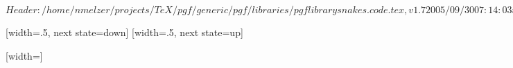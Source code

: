 \ProvidesPackageRCS[v\pgfversion] $Header: /home/nmelzer/projects/TeX/pgf/generic/pgf/libraries/pgflibrarysnakes.code.tex,v 1.7 2005/09/30 07:14:03 tantau Exp $

%


\newdimen\pgfsnakesegmentamplitude
\newdimen\pgfsnakesegmentlength
\def\pgfsnakesegmentangle{45}
\def\pgfsnakesegmentobjectlength{\pgfsnakesegmentamplitude}
\def\pgfsnakesegmentaspect{0.5}

\pgfsnakesegmentlength=10pt
\pgfsnakesegmentamplitude=2.5pt








%

{
  [width=.5\pgfsnakesegmentlength,%
             next state=down]
  {
    \pgfpathlineto{\pgfpoint{.25\pgfsnakesegmentlength}{\pgfsnakesegmentamplitude}}
    \pgfpathlineto{\pgfpoint{.5\pgfsnakesegmentlength}{0pt}}
  }
  [width=.5\pgfsnakesegmentlength,%
               next state=up]
  {
    \pgfpathlineto{\pgfpoint{.25\pgfsnakesegmentlength}{-\pgfsnakesegmentamplitude}}
    \pgfpathlineto{\pgfpoint{.5\pgfsnakesegmentlength}{0pt}}
  }
  { \pgfpathlineto{\pgfpoint{\pgfsnakeremainingdistance}{0pt}} }
}



%

{
  [width=\pgfsnakesegmentlength]
  {
    \pgfpathlineto{\pgfpoint{\pgfsnakesegmentlength}{\pgfsnakesegmentamplitude}}
    \pgfpathlineto{\pgfpoint{\pgfsnakesegmentlength}{0pt}}
  }
  {
    \pgfpathlineto{\pgfpoint{\pgfsnakeremainingdistance}{0pt}}
  }
}


%

